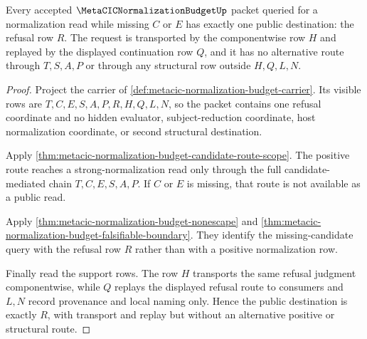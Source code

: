 \begin{theorem}
\label{thm:metacic-normalization-budget-refusal-exactness}
Every accepted $\MetaCICNormalizationBudgetUp$ packet queried for a normalization read while missing $C$ or $E$ has exactly one public destination: the refusal row $R$. The request is transported by the componentwise row $H$ and replayed by the displayed continuation row $Q$, and it has no alternative route through $T,S,A,P$ or through any structural row outside $H,Q,L,N$.
\end{theorem}
\begin{proof}
Project the carrier of \autoref{def:metacic-normalization-budget-carrier}. Its visible rows are $T,C,E,S,A,P,R,H,Q,L,N$, so the packet contains one refusal coordinate and no hidden evaluator, subject-reduction coordinate, host normalization coordinate, or second structural destination.

Apply \autoref{thm:metacic-normalization-budget-candidate-route-scope}. The positive route reaches a strong-normalization read only through the full candidate-mediated chain $T,C,E,S,A,P$. If $C$ or $E$ is missing, that route is not available as a public read.

Apply \autoref{thm:metacic-normalization-budget-nonescape} and \autoref{thm:metacic-normalization-budget-falsifiable-boundary}. They identify the missing-candidate query with the refusal row $R$ rather than with a positive normalization row.

Finally read the support rows. The row $H$ transports the same refusal judgment componentwise, while $Q$ replays the displayed refusal route to consumers and $L,N$ record provenance and local naming only. Hence the public destination is exactly $R$, with transport and replay but without an alternative positive or structural route.
\end{proof}

